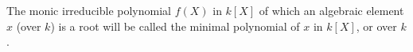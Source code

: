 The monic irreducible polynomial $f(X)$ in $k[X]$ of which an algebraic element $x$ (over $k$) is a root will be called the minimal polynomial of $x$ in $k[X]$, or over $k$.
